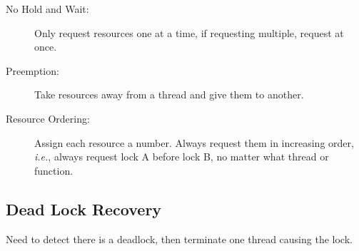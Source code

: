 \documentclass[12pt]{article}
\begin{document}
\begin{description}
    \item[No Hold and Wait:] Only request resources one at a time, if requesting
        multiple, request at once.
    \item[Preemption:]  Take resources away from a thread and give them to
        another.
    \item[Resource Ordering:] Assign each resource a number. Always request them
        in increasing order, \textit{i.e.}, always request lock A before lock B,
        no matter what thread or function.
\end{description}

\subsection{Dead Lock Recovery}

Need to detect there is a deadlock, then terminate one thread causing the lock.
\end{document}
